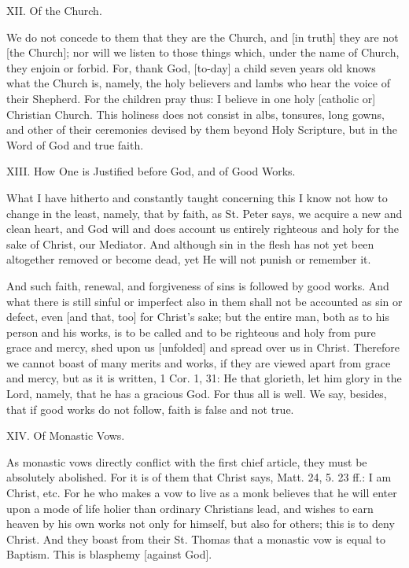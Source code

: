 XII. Of the Church.

We do not concede to them that they are the Church, and [in
truth] they are not [the Church]; nor will we listen to those
things which, under the name of Church, they enjoin or forbid.
For, thank God, [to-day] a child seven years old knows what
the Church is, namely, the holy believers and lambs who hear
the voice of their Shepherd. For the children pray thus: I
believe in one holy [catholic or] Christian Church. This
holiness does not consist in albs, tonsures, long gowns, and
other of their ceremonies devised by them beyond Holy
Scripture, but in the Word of God and true faith.

XIII. How One is Justified before God, and of Good Works.

What I have hitherto and constantly taught concerning this I
know not how to change in the least, namely, that by faith, as
St. Peter says, we acquire a new and clean heart, and God will
and does account us entirely righteous and holy for the sake
of Christ, our Mediator. And although sin in the flesh has not
yet been altogether removed or become dead, yet He will not
punish or remember it.

And such faith, renewal, and forgiveness of sins is followed
by good works. And what there is still sinful or imperfect
also in them shall not be accounted as sin or defect, even
[and that, too] for Christ's sake; but the entire man, both as
to his person and his works, is to be called and to be
righteous and holy from pure grace and mercy, shed upon us
[unfolded] and spread over us in Christ. Therefore we cannot
boast of many merits and works, if they are viewed apart from
grace and mercy, but as it is written, 1 Cor. 1, 31: He that
glorieth, let him glory in the Lord, namely, that he has a
gracious God. For thus all is well. We say, besides, that if
good works do not follow, faith is false and not true.

XIV. Of Monastic Vows.

As monastic vows directly conflict with the first chief
article, they must be absolutely abolished. For it is of them
that Christ says, Matt. 24, 5. 23 ff.: I am Christ, etc. For
he who makes a vow to live as a monk believes that he will
enter upon a mode of life holier than ordinary Christians
lead, and wishes to earn heaven by his own works not only for
himself, but also for others; this is to deny Christ. And they
boast from their St. Thomas that a monastic vow is equal to
Baptism. This is blasphemy [against God].

